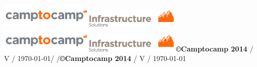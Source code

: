 \usepackage{lastpage}
\usepackage[headsepline,footsepline]{scrlayer-scrpage}


\newcommand{\ctoclogo}{\includegraphics[width=12em]{camptocamp.png}}
\newcommand{\ctocinfralogo}{\includegraphics[width=12em]{rapport_logo_haut_droite_infrastructure_rgb.png}}
\newcommand{\ctocinfraheader}{\ctoclogo\hfill{}\ctocinfralogo}

\usepackage[ddmmyyyy]{datetime}
\renewcommand{\dateseparator}{.}

\newcommand{\footerstyle}{\color{c2c}\normalfont}
\newcommand{\ctoccopyright}{\textbf{\copyright Camptocamp 2014} /  V\docversion{} / \today}
\newcommand{\pagenum}{\pagemark/\pageref{LastPage}}

%
  {%
    {\ctocinfraheader}
    {\ctocinfraheader}
    {}
  }%
  {%
    {\footerstyle\ctoccopyright\hfill\pagenum}
    {\footerstyle\pagenum\hfill\ctoccopyright}
    {}
  } %

\pagestyle{c2c}
\renewcommand*{\chapterpagestyle}{c2c}
